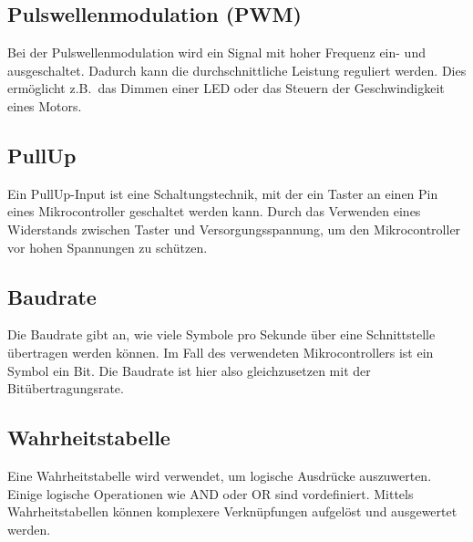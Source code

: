 \subsection{Pulswellenmodulation (PWM)}
\label{subsec:pulsewellenmodulation}

Bei der Pulswellenmodulation wird ein Signal mit hoher Frequenz ein- und ausgeschaltet.
Dadurch kann die durchschnittliche Leistung reguliert werden.
Dies ermöglicht z.B.\ das Dimmen einer LED oder das Steuern der Geschwindigkeit eines Motors.

\subsection{PullUp}
\label{subsec:pullup}

Ein PullUp-Input ist eine Schaltungstechnik, mit der ein Taster an einen Pin eines Mikrocontroller geschaltet werden kann.
Durch das Verwenden eines Widerstands zwischen Taster und Versorgungsspannung, um den Mikrocontroller vor hohen Spannungen zu schützen.

\subsection{Baudrate}
\label{subsec:baudrate}

Die Baudrate gibt an, wie viele Symbole pro Sekunde über eine Schnittstelle übertragen werden können.
Im Fall des verwendeten Mikrocontrollers ist ein Symbol ein Bit.
Die Baudrate ist hier also gleichzusetzen mit der Bitübertragungsrate.

\subsection{Wahrheitstabelle}
\label{subsec:wahrheitstabelle}

Eine Wahrheitstabelle wird verwendet, um logische Ausdrücke auszuwerten.
Einige logische Operationen wie AND oder OR sind vordefiniert.
Mittels Wahrheitstabellen können komplexere Verknüpfungen aufgelöst und ausgewertet werden.
